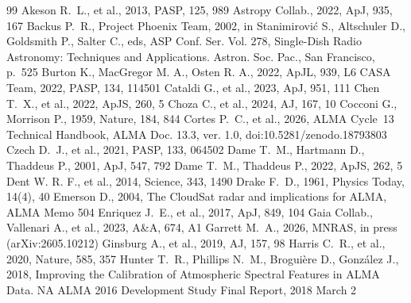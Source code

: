 \documentclass[twocolumn,twocolappendix,numberedappendix,appendixfloats]{openjournal}
\begin{document}
%
%
%
%
%
%
\begin{thebibliography}{99}
 Akeson R.~L., et al., 2013, PASP, 125, 989
 Astropy Collab., 2022, ApJ, 935, 167
 Backus P.~R., Project Phoenix Team, 2002, in Stanimirovi\'{c} S., Altschuler D., Goldsmith P., Salter C., eds, ASP Conf. Ser. Vol. 278, Single-Dish Radio Astronomy: Techniques and Applications. Astron. Soc. Pac., San Francisco, p.~525
 Burton K., MacGregor M. A., Osten R. A., 2022, ApJL, 939, L6
 CASA Team, 2022, PASP, 134, 114501
 Cataldi G., et al., 2023, ApJ, 951, 111
 Chen T.~X., et al., 2022, ApJS, 260, 5
 Choza C., et al., 2024, AJ, 167, 10
 Cocconi G., Morrison P., 1959, Nature, 184, 844
 Cortes P.~C., et al., 2026, ALMA Cycle~13 Technical Handbook, ALMA Doc. 13.3, ver. 1.0, doi:10.5281/zenodo.18793803
 Czech D.~J., et al., 2021, PASP, 133, 064502
 Dame T.~M., Hartmann D., Thaddeus P., 2001, ApJ, 547, 792
 Dame T.~M., Thaddeus P., 2022, ApJS, 262, 5
 Dent W. R. F., et al., 2014, Science, 343, 1490
 Drake F.~D., 1961, Physics Today, 14(4), 40
 Emerson D., 2004, The CloudSat radar and implications for ALMA, ALMA Memo 504
 Enriquez J.~E., et al., 2017, ApJ, 849, 104
 Gaia Collab., Vallenari A., et al., 2023, A\&A, 674, A1
 Garrett M.~A., 2026, MNRAS, in press (arXiv:2605.10212)
 Ginsburg A., et al., 2019, AJ, 157, 98
 Harris C.~R., et al., 2020, Nature, 585, 357
 Hunter T.~R., Phillips N.~M., Brogui\`{e}re D., Gonz\'{a}lez J., 2018, Improving the Calibration of Atmospheric Spectral Features in ALMA Data. NA ALMA 2016 Development Study Final Report, 2018 March 2

\end{thebibliography}
\end{document}
